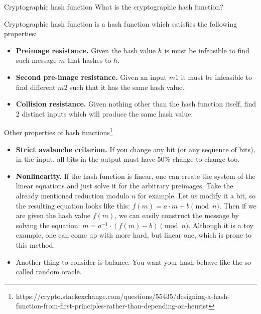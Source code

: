 \documentclass{beamer}
\begin{document}
\begin{frame}{Cryptographic hash function}
    What is the cryptographic hash function?
    \pause
    \begin{definition}
        Cryptographic hash function is a hash function which satisfies the 
        following properties:
        \begin{itemize}
            \item \textbf{Preimage resistance.} Given the hash value $h$ is must be 
            infeasible to find such message $m$ that hashes to $h$.
            \pause
            \item \textbf{Second pre-image resistance.} Given an input $m1$ it 
            must be infeasible to find different $m2$ such that it has the 
            same hash value.
            \pause
            \item \textbf{Collision resistance.} Given nothing other than the 
            hash function itself, find 2 distinct inputs which will produce the 
            same hash value.
        \end{itemize}
    \end{definition}
\end{frame}

\begin{frame}{Other properties of hash functions\footnote{https://crypto.stackexchange.com/questions/55435/designing-a-hash-function-from-first-principles-rather-than-depending-on-heurist}}
    \begin{itemize}
        \item \textbf{Strict avalanche criterion.} If you change any bit (or 
        any sequence of bits), in the input, all bits in the output must have 
        50\% change to change too.
        \pause
        \item \textbf{Nonlinearity.} If the hash function is linear, one can 
        create the system of the linear equations and just solve it for the 
        arbitrary preimages. Take the already mentioned reduction modulo $n$
        for example. Let us modify it a bit, so the resulting equation looks 
        like this: $f(m) = a \cdot m + b \pmod n$. Then if we are given the 
        hash value $f(m)$, we can easily construct the message by solving the 
        equation: $m = a^{-1} \cdot (f(m) - b) \pmod n$. Although it is a toy 
        example, one can come up with more hard, but linear one, which is prone 
        to this method.
        \pause
        \item Another thing to consider is balance. You want your hash behave 
        like the so called random oracle. 
    \end{itemize}
\end{frame}
\end{document}
